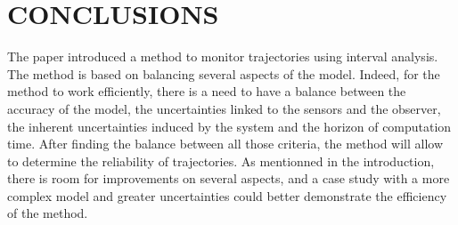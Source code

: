 \documentclass[letterpaper, 10 pt, conference]{ieeeconf}  %
\begin{document}
\section{CONCLUSIONS}
The paper introduced a method to monitor trajectories using interval analysis. The method is based on balancing several aspects of the model. Indeed, for the method to work efficiently, there is a need to have a balance between the accuracy of the model, the uncertainties linked to the sensors and the observer, the inherent uncertainties induced by the system and the horizon of computation time. After finding the balance between all those criteria, the method will allow to determine the reliability of trajectories. As mentionned in the introduction, there is room for improvements on several aspects, and a case study with a more complex model and greater  uncertainties could better demonstrate the efficiency of the method. 



\addtolength{\textheight}{-12cm}   %







% 
% 
% 
% 
% 


\end{document}
